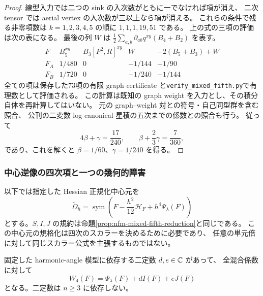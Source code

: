 \begin{proof}
線型入力では二つの sink の入次数がともに一でなければ項が消え、
二次 tensor では aerial vertex の入次数が三以上なら項が消える。
これらの条件で残る非零項数は $k=1,2,3,4,5$ の順に
$1,1,1,19,51$ である。
上の式の三項の評価は次の表になる。
最後の列 $W$ は $\frac12\sum_{a,b}\partial_{ab}q^{xy}(B_4+B_2)$ を表す。
\[
\begin{array}{c|ccc|c}
 F&B_5^{xy}&B_3[P^2,R]^{xy}&W&-2(B_5+B_3)+W\\\hline
 F_A&1/480&0&-1/144&-1/90\\
 F_B&1/720&0&-1/240&-1/144
\end{array}
\]
全ての項は保存した73項の有限 graph certificate と\texttt{verify\_mixed\_fifth.py}で有理数として評価される。
この計算は既知の graph weight を入力とし、その積分自体を再計算してはいない。
元の graph--weight 対との符号・自己同型群を含む照合、
公刊の二変数 log-canonical 星積の五次までの係数との照合も行う。
従って
\[
 4\beta+\gamma=\frac{17}{240},\qquad
 \beta+\frac23\gamma=\frac7{360},
\]
であり、これを解くと $\beta=1/60$、$\gamma=1/240$ を得る。
\end{proof}


\subsubsection{中心逆像の四次項と一つの幾何的障害}

以下では指定した Hessian 正規化中心元を
\[
 \widetilde\Omega_h=\operatorname{sym}
 \left(F-\frac{h^2}{12}\mathscr H_F+h^4\Psi_\lambda(F)\right)
\]
とする。$S,I,J$ の規約は命題\ref{prop:nfm-mixed-fifth-reduction}と同じである。
この中心元の規格化は四次のスカラーを決めるために必要であり、
任意の単元倍に対して同じスカラー公式を主張するものではない。

\begin{lemma}[四次中心逆像の局所共変式]
\label{lem:nfm-fourth-center-locality}
固定した harmonic-angle 模型に依存する二定数 $d,e\in\mathbb C$ があって、
全混合係数に対して
\[
 W_4(F)=\Psi_\lambda(F)+d I(F)+e J(F)
\]
となる。二定数は $n\ge3$ に依存しない。
\end{lemma}

